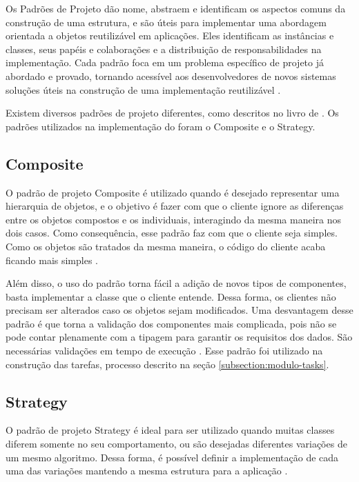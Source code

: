 \documentclass[12pt]{tcc}
\begin{document}
		Os Padrões de Projeto dão nome, abstraem e identificam os aspectos comuns da construção de uma estrutura, e são úteis para implementar uma abordagem orientada a objetos reutilizável em aplicações. Eles identificam as instâncias e classes, seus papéis e colaborações e a distribuição de responsabilidades na implementação. Cada padrão foca em um problema específico de projeto já abordado e provado, tornando acessível aos desenvolvedores de novos sistemas soluções úteis na construção de uma implementação reutilizável \citep{gamma1994design}.
		
		Existem diversos padrões de projeto diferentes, como descritos no livro de \cite{gamma1994design}. Os padrões utilizados na implementação do  foram o Composite e o Strategy.

		\subsection{Composite}
		\label{subsection:composite}

		O padrão de projeto Composite é utilizado quando é desejado representar uma hierarquia de objetos, e o objetivo é fazer com que o cliente ignore as diferenças entre os objetos compostos e os individuais, interagindo da mesma maneira nos dois casos. Como consequência, esse padrão faz com que o cliente seja simples. Como os objetos são tratados da mesma maneira, o código do cliente acaba ficando mais simples \citep[Capítulo 4]{gamma1994design}.
		
		Além disso, o uso do padrão torna fácil a adição de novos tipos de componentes, basta implementar a classe que o cliente entende. Dessa forma, os clientes não precisam ser alterados caso os objetos sejam modificados. Uma desvantagem desse padrão é que torna a validação dos componentes mais complicada, pois não se pode contar plenamente com a tipagem para garantir os requisitos dos dados. São necessárias validações em tempo de execução \citep[Capítulo 4]{gamma1994design}. Esse padrão foi utilizado na construção das tarefas, processo descrito na seção \ref{subsection:modulo-tasks}.

		\subsection{Strategy}
		\label{subsection:strategy}

		O padrão de projeto Strategy é ideal para ser utilizado quando muitas classes diferem somente no seu comportamento, ou são desejadas diferentes variações de um mesmo algoritmo. Dessa forma, é possível definir a implementação de cada uma das variações mantendo a mesma estrutura para a aplicação \citep{gamma1994design}. 
\end{document}

